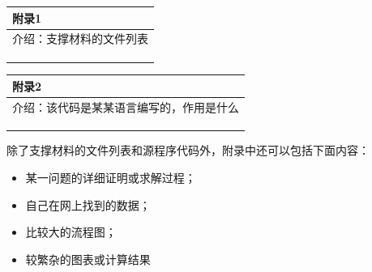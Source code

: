 \documentclass{my_paper}
\begin{document}
\begin{table}[htbp]
    \centering
    \begin{tabular}{|p{14.0cm}|}
    \hline
    \textbf{附录1} \\ %
    \hline
    介绍：支撑材料的文件列表  \\ 
    \\
    \\
    \\
    \hline
    \end{tabular}
\end{table}

\begin{table}[htbp]
    \centering
    \begin{tabular}{|p{14.0cm}|}
    \hline
    \textbf{附录2} \\ %
    \hline
    介绍：该代码是某某语言编写的，作用是什么   \\ 
    \\
    \\
    \\
    \hline
    \end{tabular}
\end{table}

除了支撑材料的文件列表和源程序代码外，附录中还可以包括下面内容：
\begin{itemize}
\item 某一问题的详细证明或求解过程；
\item 自己在网上找到的数据；
\item 比较大的流程图；
\item 较繁杂的图表或计算结果
\end{itemize}
\end{document}
